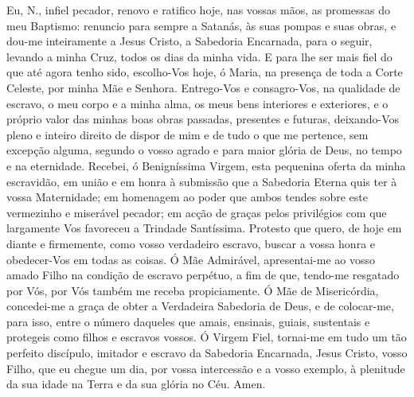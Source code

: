 Eu, {\redx N.}, infiel pecador, renovo e ratifico hoje, nas vossas mãos, as promessas do meu Baptismo: renuncio para sempre a Satanás, às suas pompas e suas obras, e dou-me inteiramente a Jesus Cristo, a Sabedoria Encarnada, para o seguir, levando a minha Cruz, todos os dias da minha vida. E para lhe ser mais fiel do que até agora tenho sido, escolho-Vos hoje, ó Maria, na presença de toda a Corte Celeste, por minha Mãe e Senhora. Entrego-Vos e consagro-Vos, na qualidade de escravo, o meu corpo e a minha alma, os meus bens interiores e exteriores, e o próprio valor das minhas boas obras passadas, presentes e futuras, deixando-Vos pleno e inteiro direito de dispor de mim e de tudo o que me pertence, sem excepção alguma, segundo o vosso agrado e para maior glória de Deus, no tempo e na eternidade.
Recebei, ó Benigníssima Virgem, esta pequenina oferta da minha escravidão, em união e em honra à submissão que a Sabedoria Eterna quis ter à vossa Maternidade; em homenagem ao poder que ambos tendes sobre este vermezinho e miserável pecador; em acção de graças pelos privilégios com que largamente Vos favoreceu a Trindade Santíssima.
Protesto que quero, de hoje em diante e firmemente, como vosso verdadeiro escravo, buscar a vossa honra e obedecer-Vos em todas as coisas.
Ó Mãe Admirável, apresentai-me ao vosso amado Filho na condição de escravo perpétuo, a fim de que, tendo-me resgatado por Vós, por Vós também me receba propiciamente.
Ó Mãe de Misericórdia, concedei-me a graça de obter a Verdadeira Sabedoria de Deus, e de colocar-me, para isso, entre o número daqueles que amais, ensinais, guiais, sustentais e protegeis como filhos e escravos vossos.
Ó Virgem Fiel, tornai-me em tudo um tão perfeito discípulo, imitador e escravo da Sabedoria Encarnada, Jesus Cristo, vosso Filho, que eu chegue um dia, por vossa intercessão e a vosso exemplo, à plenitude da sua idade na Terra e da sua glória no Céu. Amen.

